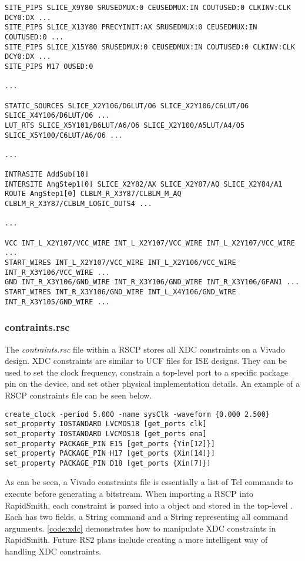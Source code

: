 \begin{lstlisting}[numbers=none]
SITE_PIPS SLICE_X9Y80 SRUSEDMUX:0 CEUSEDMUX:IN COUTUSED:0 CLKINV:CLK DCY0:DX ...
SITE_PIPS SLICE_X13Y80 PRECYINIT:AX SRUSEDMUX:0 CEUSEDMUX:IN COUTUSED:0 ...
SITE_PIPS SLICE_X15Y80 SRUSEDMUX:0 CEUSEDMUX:IN COUTUSED:0 CLKINV:CLK DCY0:DX ...
SITE_PIPS M17 OUSED:0 

... 

STATIC_SOURCES SLICE_X2Y106/D6LUT/O6 SLICE_X2Y106/C6LUT/O6 SLICE_X4Y106/D6LUT/O6 ...
LUT_RTS SLICE_X5Y101/B6LUT/A6/O6 SLICE_X2Y100/A5LUT/A4/O5 SLICE_X5Y100/C6LUT/A6/O6 ...

...

INTRASITE AddSub[10]
INTERSITE AngStep1[0] SLICE_X2Y82/AX SLICE_X2Y87/AQ SLICE_X2Y84/A1
ROUTE AngStep1[0] CLBLM_R_X3Y87/CLBLM_M_AQ CLBLM_R_X3Y87/CLBLM_LOGIC_OUTS4 ...

...

VCC INT_L_X2Y107/VCC_WIRE INT_L_X2Y107/VCC_WIRE INT_L_X2Y107/VCC_WIRE ...
START_WIRES INT_L_X2Y107/VCC_WIRE INT_L_X2Y106/VCC_WIRE INT_R_X3Y106/VCC_WIRE ...
GND INT_R_X3Y106/GND_WIRE INT_R_X3Y106/GND_WIRE INT_R_X3Y106/GFAN1 ...
START_WIRES INT_R_X3Y106/GND_WIRE INT_L_X4Y106/GND_WIRE INT_R_X3Y105/GND_WIRE ...
\end{lstlisting}

\subsubsection{contraints.rsc}
The \textit{contraints.rsc} file within a RSCP stores all XDC constraints on a
Vivado design. XDC constraints are similar to UCF files for ISE designs. They
can be used to set the clock frequency, constrain a top-level port to a specific
package pin on the device, and set other physical implementation details. An
example of a RSCP constraints file can be seen below.

\begin{lstlisting}[numbers=none]
create_clock -period 5.000 -name sysClk -waveform {0.000 2.500}
set_property IOSTANDARD LVCMOS18 [get_ports clk]
set_property IOSTANDARD LVCMOS18 [get_ports ena]
set_property PACKAGE_PIN E15 [get_ports {Yin[12]}]
set_property PACKAGE_PIN H17 [get_ports {Xin[14]}]
set_property PACKAGE_PIN D18 [get_ports {Xin[7]}]
\end{lstlisting}

\noindent
As can be seen, a Vivado constraints file is essentially a list of Tcl commands
to execute before generating a bitstream. When importing a RSCP into RapidSmith,
each constraint is parsed into a  object and stored in the
top-level \celldesign. Each  has two fields, a String
command and a String representing all command arguments. \autoref{code:xdc}
demonstrates how to manipulate XDC constraints in RapidSmith. Future RS2 plans
include creating a more intelligent way of handling XDC constraints. 

